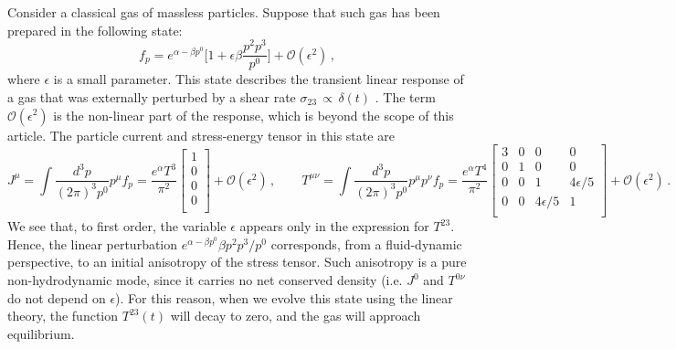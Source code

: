 \documentclass[a4paper, amsfonts, amssymb, amsmath, reprint, showkeys, nofootinbib, twoside, onecolumn,notitlepage,,longbibliography]{revtex4-2}
\theoremstyle{definition}
\theoremstyle{theorem}
\theoremstyle{corollary}
\begin{document}
Consider a classical gas of massless particles. 
Suppose that such gas has been prepared in the following state:
\begin{equation}\label{exciuto}
f_p= e^{\alpha -\beta p^0} \bigg[ 1+\epsilon \beta \dfrac{p^2 p^3}{p^0}\bigg] +\mathcal{O}(\epsilon^2) \, ,
\end{equation}
where $\epsilon$ is a small parameter. This state describes the transient linear response of a gas that was externally perturbed by a shear rate $\sigma_{23} \, {\propto}  \, \delta (t)$ \cite[Eq.s (48) and (49)]{Denicol_Relaxation_2011}. The term $\mathcal{O}(\epsilon^2)$ is the non-linear part of the response, which is beyond the scope of this article.
The particle current and stress-energy tensor in this state are
\begin{equation}
J^\mu = \int \dfrac{d^3 p}{(2\pi)^3 p^0} p^\mu f_p = \dfrac{e^\alpha T^3}{\pi^2} 
\begin{bmatrix}
1 \\
0 \\
0 \\
0 \\
\end{bmatrix} +\mathcal{O}(\epsilon^2) \, , \quad \quad 
T^{\mu \nu} = \int \dfrac{d^3 p}{(2\pi)^3 p^0} p^\mu  p^\nu f_p = \dfrac{e^\alpha T^4}{\pi^2} 
\begin{bmatrix}
3 & 0 & 0 & 0 \\
0 & 1 & 0 & 0 \\
0 & 0 & 1 & 4\epsilon/5 \\
0 & 0 & 4\epsilon/5 & 1 \\
\end{bmatrix} +\mathcal{O}(\epsilon^2) \, .
\end{equation}
We see that, to first order, the variable $\epsilon$ appears only in the expression for $T^{23}$. Hence, the linear perturbation $e^{\alpha -\beta p^0}  \beta p^2 p^3/p^0$ corresponds, from a fluid-dynamic perspective, to an initial anisotropy of the stress tensor. Such anisotropy is a pure non-hydrodynamic mode, since it carries no net conserved density (i.e. $J^0$ and $T^{0 \nu}$ do not depend on $\epsilon$). For this reason, when we evolve this state using the linear theory, the function $T^{23}(t)$ will decay to zero, and the gas will approach equilibrium. 
\end{document}
